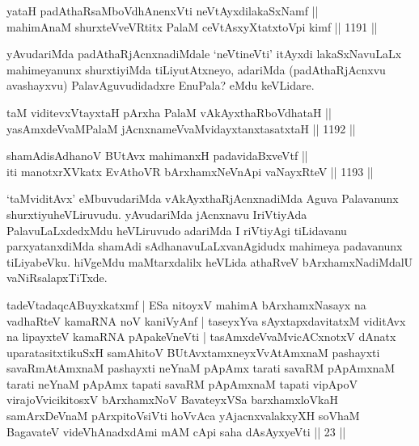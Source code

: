 
\begin{shl}
yataH padAthaRsaMboVdhAnenxVti neVtAyxdilakaSxNamf || \\
mahimAnaM shurxteVveVRtitx PalaM ceVtAsxyXtatxtoV\s pi kimf \hfill || 1191 ||  
\end{shl}

\begin{artha}
yAvudariMda padAthaRjAcnxnadiMdale `neVtineVti' itAyxdi lakaSxNavuLaLx mahimeyanunx shurxtiyiMda tiLiyutAtxneyo, adariMda (padAthaRjAcnxvu avashayxvu) PalavAguvudidadxre EnuPala? eMdu keVLidare.
\end{artha}

\begin{shl}
taM viditevxVtayxtaH pArxha PalaM vAkAyxthaRboVdhataH || \\
yasAmxdeVvaMPalaM jAcnxnameVvaMvidayxtanxtasatxtaH \hfill || 1192 ||  
\end{shl}
				
\begin{shl}
shamAdisAdhanoV BUtAvx mahimanxH padavidaBxveVtf ||  \\
iti manotxrXVkatx EvAthoVR bArxhamxNeVnApi vaNayxRteV \hfill || 1193 ||  
\end{shl}


\begin{artha}
`taMviditAvx' eMbuvudariMda vAkAyxthaRjAcnxnadiMda Aguva Palavanunx shurxtiyuheVLiruvudu. yAvudariMda jAcnxnavu IriVtiyAda PalavuLaLxdedxMdu heVLiruvudo adariMda I riVtiyAgi tiLidavanu parxyatanxdiMda shamAdi sAdhanavuLaLxvanAgidudx mahimeya padavanunx tiLiyabeVku. hiVgeMdu maMtarxdalilx heVLida athaRveV bArxhamxNadiMdalU vaNiRsalapxTiTxde.
\end{artha}


\begin {kandikeshl}
tadeVtadaqcABuyxkatxmf | ESa nitoyxV mahimA bArxhamxNasayx na vadhaRteV kamaRNA noV kaniVyAnf | taseyxYva sAyxtapxdavitatxM viditAvx na lipayxteV kamaRNA pApakeVneVti | tasAmxdeVvaMvicACxnotxV dAnatx uparatasitxtikuSxH samAhitoV BUtAvxtamxneyxVvAtAmxnaM pashayxti savaRmAtAmxnaM pashayxti neYnaM pApAmx tarati savaRM pApAmxnaM tarati neYnaM pApAmx tapati savaRM pApAmxnaM tapati vipApoV virajoV\s vicikitosxV bArxhamxNoV BavateyxVSa barxhamxloVkaH samArxDeVnaM pArxpitoV\s siVti hoVvAca yAjacnxvalakxyXH soV\s haM BagavateV videVhAnadxdAmi mAM cApi saha dAsAyxyeVti || 23 ||
\end{kandikeshl}

